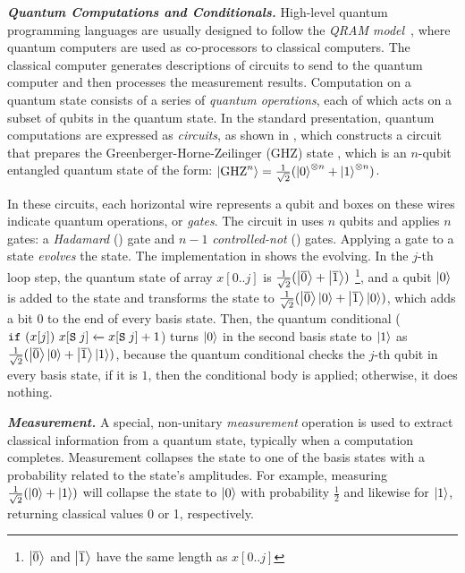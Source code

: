 \noindent\textbf{\textit{Quantum Computations and Conditionals.}} High-level quantum programming languages are usually designed to follow the \emph{QRAM model}~\cite{Knill1996}, where quantum computers are used as co-processors to classical computers. The classical computer generates descriptions of circuits to send to the quantum computer and then processes the measurement results.
Computation on a quantum state consists of a series of \emph{quantum operations}, each of which acts on a subset of qubits in the quantum state. In the standard presentation, quantum computations are expressed as \emph{circuits}, as shown in , which constructs a circuit that prepares the Greenberger-Horne-Zeilinger (GHZ) state \cite{Greenberger1989}, which is an $n$-qubit entangled quantum state of the form: $\left\vert{\text{GHZ}^n}\right\rangle = \frac{1}{\sqrt{2}}(\left\vert{0}\right\rangle^{\otimes n}+\left\vert{1}\right\rangle^{\otimes n})$.

In these circuits, each horizontal wire represents a qubit and boxes on these wires indicate quantum operations, or \emph{gates}. The circuit in  uses $n$ qubits and applies $n$ gates: a \emph{Hadamard} () gate and $n-1$ \emph{controlled-not} () gates.
Applying a gate to a state \emph{evolves} the state. 
The \qafny implementation in  shows the evolving. In the $j$-th loop step, the quantum state of array $x[0..j]$ is $\frac{1}{\sqrt{2}}(\left\vert{\overline{0}}\right\rangle+\left\vert{\overline{1}}\right\rangle)$ \footnote{$\left\vert{\overline{0}}\right\rangle$ and $\left\vert{\overline{1}}\right\rangle$ have the same length as $x[0..j]$}, and a qubit $\left\vert{0}\right\rangle$ is added to the state and transforms the state to $\frac{1}{\sqrt{2}}(\left\vert{\overline{0}}\right\rangle\left\vert{0}\right\rangle+\left\vert{\overline{1}}\right\rangle\left\vert{0}\right\rangle)$, which adds a bit $0$ to the end of every basis state. Then, the quantum conditional 
($\texttt{if}~{(x[j])}~{{x[\texttt{S}\;j]} \xleftarrow{} {x[\texttt{S}\;j]+1}}$) turns $\left\vert{0}\right\rangle$ in the second basis state to $\left\vert{1}\right\rangle$ as $\frac{1}{\sqrt{2}}(\left\vert{\overline{0}}\right\rangle\left\vert{0}\right\rangle+\left\vert{\overline{1}}\right\rangle\left\vert{1}\right\rangle)$, because the quantum conditional checks the $j$-th qubit in every basis state, if it is $1$, then the conditional body is applied; otherwise, it does nothing.

\noindent\textbf{\textit{Measurement.}} A special, non-unitary \emph{measurement} operation is used to extract classical information from a quantum state, typically when a computation completes. Measurement collapses the state to one of the basis states with a probability related to the state's amplitudes. For example, measuring $\frac{1}{\sqrt{2}}(\left\vert{0}\right\rangle + \left\vert{1}\right\rangle)$ will collapse the state to $\left\vert{0}\right\rangle$ with probability $\frac{1}{2}$ and likewise for $\left\vert{1}\right\rangle$, returning classical values 0 or 1, respectively.

